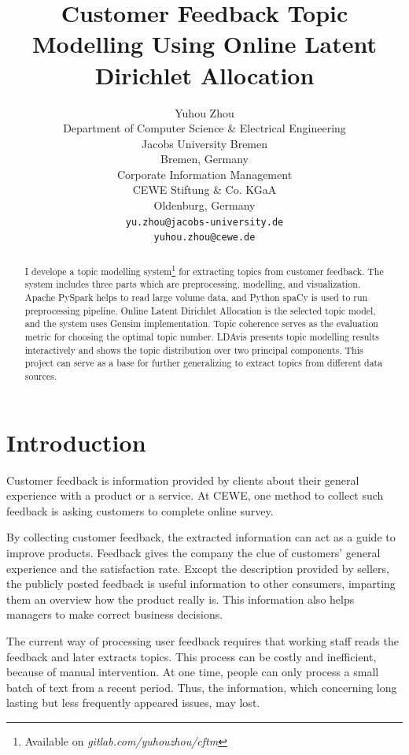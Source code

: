 \documentclass{article} %
\title{Customer Feedback Topic Modelling Using Online Latent Dirichlet Allocation}
\author{
Yuhou Zhou\\
Department of Computer Science \& Electrical Engineering\\
Jacobs University Bremen\\
Bremen, Germany\\
Corporate Information Management\\
CEWE Stiftung \& Co. KGaA\\
Oldenburg, Germany\\
\texttt{yu.zhou@jacobs-university.de}\\
\texttt{yuhou.zhou@cewe.de}\\
}
\begin{document}
    \raggedbottom
    \maketitle

    \begin{abstract}
        I develope a topic modelling system\footnote{Available on \textit{gitlab.com/yuhouzhou/cftm}} for extracting topics from customer feedback. The system includes three parts which are preprocessing, modelling, and visualization. Apache PySpark helps to read large volume data, and Python spaCy is used to run preprocessing pipeline. Online Latent Dirichlet Allocation is the selected topic model, and the system uses Gensim implementation. Topic coherence serves as the evaluation metric for choosing the optimal topic number. LDAvis presents topic modelling results interactively and shows the topic distribution over two principal components. This project can serve as a base for further generalizing to extract topics from different data sources.
    \end{abstract}

    \section{Introduction}

    Customer feedback is information provided by clients about their general experience
    with a product or a service. At CEWE, one method to collect such feedback is asking
    customers to complete online survey.

    By collecting customer feedback, the extracted information can act as a guide to
    improve products. Feedback gives the company the clue of customers' general experience
    and the satisfaction rate. Except the description provided by sellers, the publicly
    posted feedback is useful information to other consumers, imparting them an overview
    how the product really is. This information also helps managers to make correct business
    decisions.

    The current way of processing user feedback requires that working staff reads the
    feedback and later extracts topics. This process can be costly and inefficient,
    because of manual intervention. At one time, people can only process a small batch of
    text from a recent period. Thus, the information, which concerning long lasting but
    less frequently appeared issues, may lost.
\end{document}
